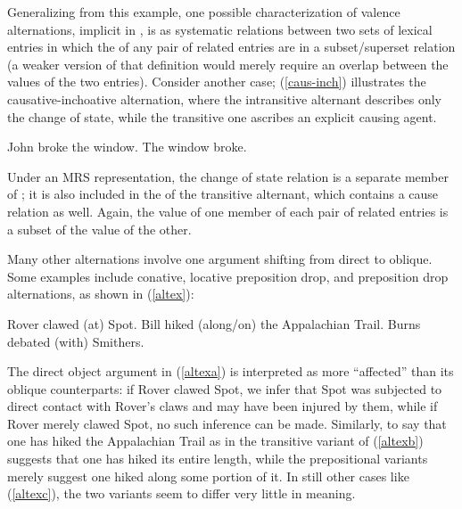 \documentclass[output=paper,biblatex,babelshorthands,newtxmath,draftmode,colorlinks, citecolor=brown]{langscibook}
\begin{document}
Generalizing from this example, one possible characterization of valence alternations, implicit in \citet{KoenigandDavis2006}, is as systematic relations between two sets of lexical entries in which the \rels of any pair of related entries are in a subset/superset relation (a weaker version of that definition would merely require an overlap between the \rels values of the two entries). 
Consider another case; (\ref{caus-inch}) illustrates the causative-inchoative alternation, where the intransitive alternant describes only the change of state, while the transitive one ascribes an explicit causing agent.

\begin{exe}
\ex\label{caus-inch}
\begin{xlist}
	\ex\label{caus-inch-a}John broke the window.
	\ex\label{caus-inch-b}The window broke.
\end{xlist}	
\end{exe}

\noindent
Under an MRS representation, the change of state relation is a separate member of \rels; it is also included in the \rels of the transitive alternant, which contains a cause relation as well.
Again, the \rels value of one member of each pair of related entries is a subset of the \rels value of the other.

Many other alternations involve one argument shifting from direct to oblique.
Some  examples include conative, locative preposition drop, and  preposition drop alternations, as shown in (\ref{altex}):

\begin{exe}\ex\label{altex}
\begin{xlist}
\ex \label{altexa} Rover clawed (at) Spot. 
\ex \label{altexb} Bill hiked (along/on) the Appalachian Trail.
\ex \label{altexc} Burns debated (with) Smithers.
\end{xlist}
\end{exe}

\noindent
The direct object argument in (\ref{altexa}) is interpreted as more ``affected'' than its oblique counterparts:  if Rover clawed Spot, we infer that Spot was subjected to direct contact with Rover's claws and may have been injured by them, while if Rover merely clawed  Spot, no such inference can be made.
Similarly, to say that one has hiked the Appalachian Trail as in the transitive variant of (\ref{altexb}) suggests that one has hiked its entire length, while the prepositional variants merely suggest one hiked along some portion of it.  In still other cases like (\ref{altexc}), the two variants seem to differ very little in meaning.  
\end{document}

